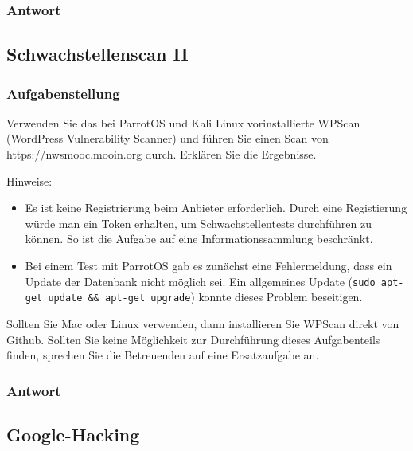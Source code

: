 \documentclass{article}
\begin{document}
\subsubsection*{Antwort}

\newpage

\subsection{Schwachstellenscan II}

\subsubsection*{Aufgabenstellung}

Verwenden Sie das bei ParrotOS und Kali Linux vorinstallierte WPScan  (WordPress 
Vulnerability Scanner) und führen Sie einen Scan von https://nwsmooc.mooin.org durch. 
Erklären Sie die Ergebnisse.  

\begin{flushleft}
	Hinweise:	
\end{flushleft}


\begin{itemize}
	\item Es ist keine Registrierung beim Anbieter erforderlich. Durch eine Registierung würde man ein Token erhalten, um Schwachstellentests durchführen zu können. So ist die Aufgabe auf eine Informationssammlung beschränkt.
	\item Bei einem Test mit ParrotOS gab es zunächst eine Fehlermeldung, dass ein Update der Datenbank nicht möglich sei. Ein allgemeines Update
		(\texttt{sudo apt-get update \&\& apt-get upgrade}) konnte dieses Problem beseitigen.
\end{itemize}

Sollten Sie Mac oder Linux verwenden, dann installieren Sie WPScan direkt von Github. 
Sollten Sie keine Möglichkeit zur Durchführung dieses Aufgabenteils finden, sprechen 
Sie die Betreuenden auf eine Ersatzaufgabe an.

\subsubsection*{Antwort}

\newpage

\subsection{Google-Hacking}
\end{document}

